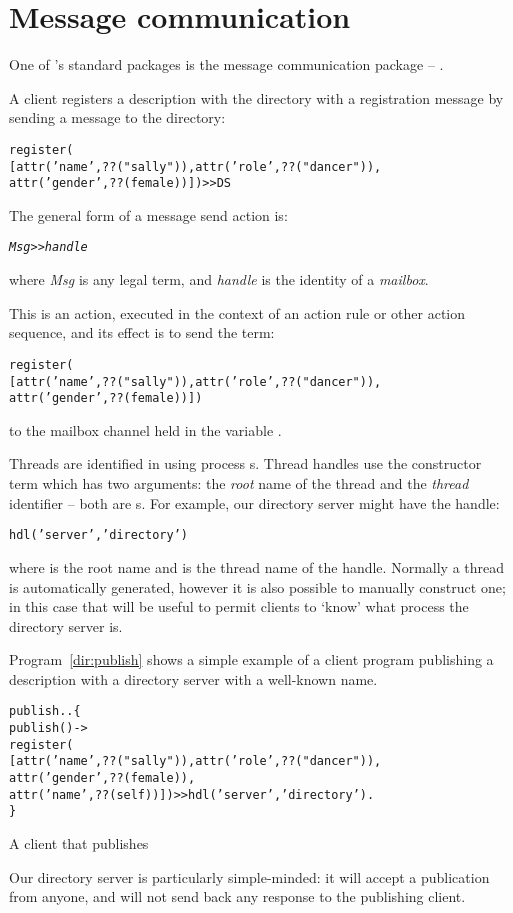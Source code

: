 \chapter{Message communication}
\label{message}

One of \go's standard packages is the message communication package -- .


A client registers a description with the directory with a registration message by sending a  message to the directory:
\begin{alltt}
register(
   [attr('name',??("sally")),attr('role',??("dancer")),
    attr('gender',??(female))]) >> DS
\end{alltt}
The general form of a message send action is:
\begin{alltt}
\emph{Msg} >> \emph{handle}
\end{alltt}
where \emph{Msg} is any legal \go term, and \emph{handle} is the identity of a \go \emph{mailbox}. 

This is an action, executed in the context of an action rule or other action sequence, and its effect is to send the term:
\begin{alltt}
register(
   [attr('name',??("sally")),attr('role',??("dancer")),
    attr('gender',??(female))])
\end{alltt}
to the mailbox channel held in the variable .

Threads are identified in \go using process s. Thread handles use the  constructor term which has two arguments: the \emph{root} name of the thread and the \emph{thread} identifier -- both are s. For example, our directory server might have the handle:
\begin{alltt}
hdl('server','directory')
\end{alltt}
where  is the root name and  is the thread name of the handle. Normally a thread  is automatically generated, however it is also possible to manually construct one; in this case that will be useful to permit clients to `know' what process the directory server is.

Program~\vref{dir:publish} shows a simple example of a client program publishing a description with a directory server with a well-known name.
\begin{program}
\begin{alltt}
publish .. \{
  publish() ->
    register(
   [attr('name',??("sally")),attr('role',??("dancer")),
    attr('gender',??(female)),
    attr('name',??(self))]) >> hdl('server','directory').
\}
\end{alltt}
\caption{A client that publishes\label{dir:publish}}
\end{program}
Our directory server is particularly simple-minded: it will accept a publication from anyone, and will not send back any response to the publishing client.








